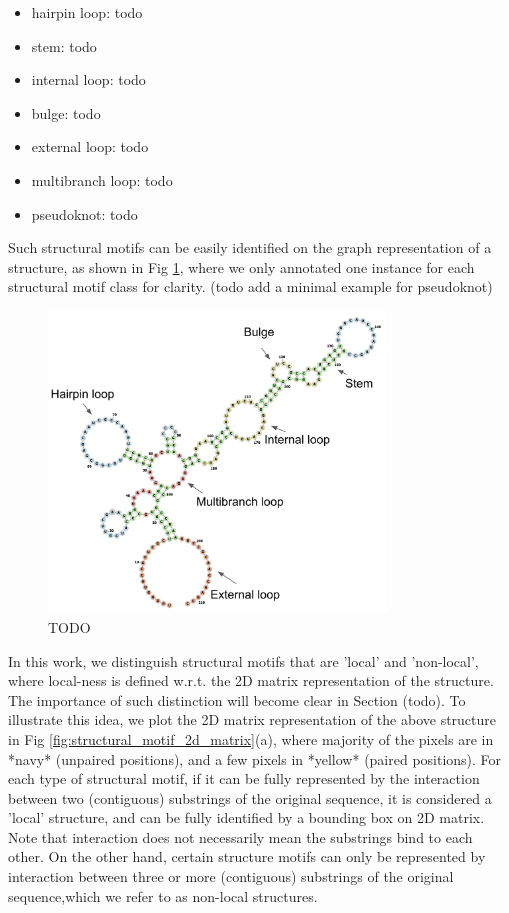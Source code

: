 \documentclass[12pt]{article}
\begin{document}
\begin{itemize}
    \item hairpin loop: todo
    \item stem: todo
    \item internal loop: todo
    \item bulge: todo
    \item external loop: todo
    \item multibranch loop: todo
    \item pseudoknot: todo
\end{itemize}

Such structural motifs can be easily identified on the graph representation of a structure,
as shown in Fig \ref{fig:structural_motif_graph}, where we only annotated one instance for
each structural motif class for clarity.
(todo add a minimal example for pseudoknot)

\begin{figure}[h]
    \centering
    \includegraphics[width=0.8\textwidth]{plot/structural_motif_graph.png}
    \caption{TODO}
    \label{fig:structural_motif_graph}
    \centering
\end{figure}


In this work, we distinguish structural motifs that are 'local' and 'non-local',
where local-ness is defined w.r.t. the 2D matrix representation of the structure.
The importance of such distinction will become clear in Section (todo).
To illustrate this idea, we plot the 2D matrix representation of the above structure
in Fig \ref{fig:structural_motif_2d_matrix}(a),
where majority of the pixels are in *navy* (unpaired positions),
and a few pixels in *yellow* (paired positions).
For each type of structural motif, if it can be fully represented by the interaction between
two (contiguous) substrings of the original sequence, it is considered a 'local' structure,
and can be fully identified by a bounding box on 2D matrix.
Note that interaction does not necessarily mean the substrings bind to each other.
On the other hand, certain structure motifs can only be represented by interaction between
three or more (contiguous) substrings of the original sequence,which we refer to as non-local structures.
\end{document}
